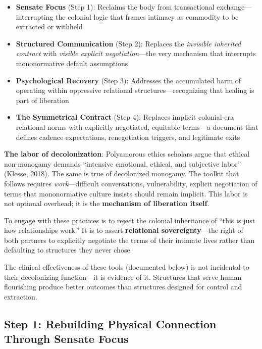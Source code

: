 \documentclass[12pt,openany]{book}
\numberwithin{equation}{chapter}
\begin{document}
\begin{itemize}
    \item \textbf{Sensate Focus} (Step 1): Reclaims the body from transactional exchange---interrupting the colonial logic that frames intimacy as commodity to be extracted or withheld

    \item \textbf{Structured Communication} (Step 2): Replaces the \textit{invisible inherited contract} with \textit{visible explicit negotiation}---the very mechanism that interrupts mononormative default assumptions

    \item \textbf{Psychological Recovery} (Step 3): Addresses the accumulated harm of operating within oppressive relational structures---recognizing that healing is part of liberation

    \item \textbf{The Symmetrical Contract} (Step 4): Replaces implicit colonial-era relational norms with explicitly negotiated, equitable terms---a document that defines cadence expectations, renegotiation triggers, and legitimate exits
\end{itemize}

\textbf{The labor of decolonization}: Polyamorous ethics scholars argue that ethical non-monogamy demands ``intensive emotional, ethical, and subjective labor'' (Klesse, 2018). The same is true of decolonized monogamy. The toolkit that follows requires \textit{work}---difficult conversations, vulnerability, explicit negotiation of terms that mononormative culture insists should remain implicit. This labor is not optional overhead; it is the \textbf{mechanism of liberation itself}.

To engage with these practices is to reject the colonial inheritance of ``this is just how relationships work.'' It is to assert \textbf{relational sovereignty}---the right of both partners to explicitly negotiate the terms of their intimate lives rather than defaulting to structures they never chose.

The clinical effectiveness of these tools (documented below) is not incidental to their decolonizing function---it is evidence of it. Structures that serve human flourishing produce better outcomes than structures designed for control and extraction.

\subsection{Step 1: Rebuilding Physical Connection Through Sensate Focus}
\end{document}
